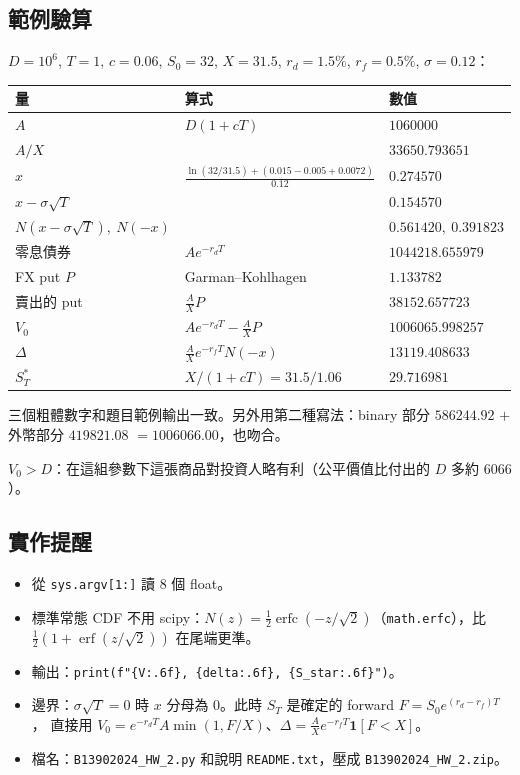 \documentclass[11pt,a4paper]{article}
\begin{document}
\subsection{範例驗算}

$D=10^6$, $T=1$, $c=0.06$, $S_0=32$, $X=31.5$, $r_d=1.5\%$, $r_f=0.5\%$, $\sigma=0.12$：

\begin{center}
\begin{tabular}{lll}
\toprule
量 & 算式 & 數值\\
\midrule
$A$ & $D(1+cT)$ & $1060000$\\
$A/X$ & & $33650.793651$\\
$x$ & $\frac{\ln(32/31.5)+(0.015-0.005+0.0072)}{0.12}$ & $0.274570$\\
$x-\sigma\sqrt T$ & & $0.154570$\\
$N(x-\sigma\sqrt T),\ N(-x)$ & & $0.561420,\ 0.391823$\\
零息債券 & $Ae^{-r_dT}$ & $1044218.655979$\\
FX put $P$ & Garman--Kohlhagen & $1.133782$\\
賣出的 put & $\frac AX P$ & $38152.657723$\\
$V_0$ & $Ae^{-r_dT}-\frac AX P$ & $\mathbf{1006065.998257}$\\
$\Delta$ & $\frac AX e^{-r_fT}N(-x)$ & $\mathbf{13119.408633}$\\
$S_T^{*}$ & $X/(1+cT)=31.5/1.06$ & $\mathbf{29.716981}$\\
\bottomrule
\end{tabular}
\end{center}
三個粗體數字和題目範例輸出一致。另外用第二種寫法：binary 部分 $586244.92$ $+$ 外幣部分 $419821.08$ $=1006066.00$，也吻合。

$V_0>D$：在這組參數下這張商品對投資人略有利（公平價值比付出的 $D$ 多約 $6066$）。

\subsection{實作提醒}
\begin{itemize}[nosep]
  \item 從 \texttt{sys.argv[1:]} 讀 8 個 float。
  \item 標準常態 CDF 不用 scipy：$N(z)=\frac12\operatorname{erfc}(-z/\sqrt2)$（\texttt{math.erfc}），比 $\frac12(1+\operatorname{erf}(z/\sqrt2))$ 在尾端更準。
  \item 輸出：\texttt{print(f"\{V:.6f\}, \{delta:.6f\}, \{S\_star:.6f\}")}。
  \item 邊界：$\sigma\sqrt T=0$ 時 $x$ 分母為 $0$。此時 $S_T$ 是確定的 forward $F=S_0e^{(r_d-r_f)T}$，
        直接用 $V_0=e^{-r_dT}A\min(1,F/X)$、$\Delta=\frac AX e^{-r_fT}\mathbf 1[F<X]$。
  \item 檔名：\texttt{B13902024\_HW\_2.py} 和說明 \texttt{README.txt}，壓成 \texttt{B13902024\_HW\_2.zip}。
\end{itemize}
\end{document}
